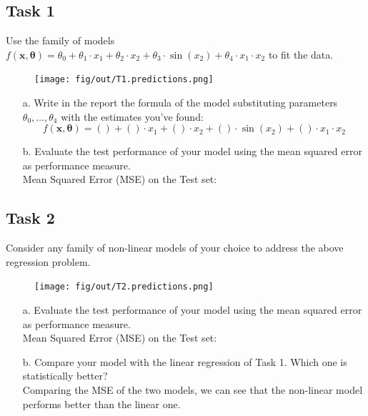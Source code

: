 \documentclass[tikz,14pt,fleqn]{article}
\begin{document}
\subsection{Task 1}
Use the family of models $f(\mathbf{x}, \boldsymbol{\theta}) = \theta_0 + \theta_1 \cdot x_1 + \theta_2 \cdot x_2 + \theta_3 \cdot \sin(x_2) + \theta_4 \cdot x_1 \cdot x_2$ to fit the data. 
\begin{figure}
    \centering
    \texttt{[image: fig/out/T1.predictions.png]}
    \vspace{-1.35cm}
    \label{fig:1.1}
\end{figure}
\begin{itemize}
	\item [a.] Write in the report the formula of the model substituting parameters $\theta_0, \ldots, \theta_4$ with the estimates you've found:
	$$f(\mathbf{x}, \boldsymbol{\theta}) = () + () \cdot x_1 + () \cdot x_2 + () \cdot \sin(x_2) + () \cdot x_1 \cdot x_2$$
	\item [b.] Evaluate the test performance of your model using the mean squared error as performance measure.\\
	Mean Squared Error (MSE) on the Test set: 
\end{itemize}

\subsection{Task 2}
Consider any family of non-linear models of your choice to address the above regression problem.
\begin{figure}
    \centering
    \texttt{[image: fig/out/T2.predictions.png]}
    \vspace{-2cm}
    \label{fig:1.1}
\end{figure}
\begin{itemize}
	\item [a.] Evaluate the test performance of your model using the mean squared error as performance measure.\\
    Mean Squared Error (MSE) on the Test set: 
	\item [b.] Compare your model with the linear regression of Task 1. Which one is {statistically} better? \\
	Comparing the MSE of the two models, we can see that the non-linear model performs better than the linear one. %
\end{itemize}
\end{document}
